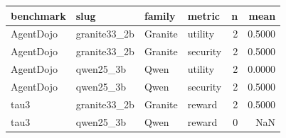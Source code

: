 \begin{tabular}{llllrr}
\toprule
benchmark & slug & family & metric & n & mean \\
\midrule
AgentDojo & granite33_2b & Granite & utility & 2 & 0.5000 \\
AgentDojo & granite33_2b & Granite & security & 2 & 0.5000 \\
AgentDojo & qwen25_3b & Qwen & utility & 2 & 0.0000 \\
AgentDojo & qwen25_3b & Qwen & security & 2 & 0.5000 \\
tau3 & granite33_2b & Granite & reward & 2 & 0.5000 \\
tau3 & qwen25_3b & Qwen & reward & 0 & NaN \\
\bottomrule
\end{tabular}

